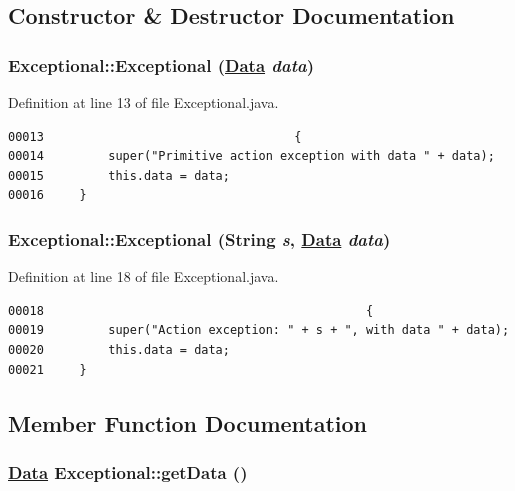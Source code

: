 \subsection{Constructor \& Destructor Documentation}
\hypertarget{classExceptional_a1}{
\subsubsection[Exceptional]{\setlength{\rightskip}{0pt plus 5cm}Exceptional::Exceptional (\hyperlink{interfaceData}{Data} {\em data})}}
\label{classExceptional_a1}




Definition at line 13 of file Exceptional.java.\footnotesize\begin{verbatim}00013                                   {
00014         super("Primitive action exception with data " + data);
00015         this.data = data;
00016     }
\end{verbatim}\normalsize 
\hypertarget{classExceptional_a2}{
\subsubsection[Exceptional]{\setlength{\rightskip}{0pt plus 5cm}Exceptional::Exceptional (String {\em s}, \hyperlink{interfaceData}{Data} {\em data})}}
\label{classExceptional_a2}




Definition at line 18 of file Exceptional.java.\footnotesize\begin{verbatim}00018                                             {
00019         super("Action exception: " + s + ", with data " + data);
00020         this.data = data;
00021     }
\end{verbatim}\normalsize 


\subsection{Member Function Documentation}
\hypertarget{classExceptional_a0}{
\subsubsection[getData]{\setlength{\rightskip}{0pt plus 5cm}\hyperlink{interfaceData}{Data} Exceptional::get\-Data ()}}
\label{classExceptional_a0}




